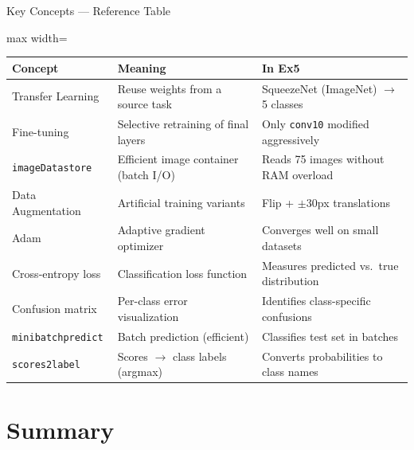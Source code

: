 \documentclass[aspectratio=169,xcolor=dvipsnames]{beamer}
\begin{document}
\begin{frame}{Key Concepts — Reference Table}
    \begin{adjustbox}{max width=\textwidth}
    \begin{tabular}{lll}
        \toprule
        \textbf{Concept} & \textbf{Meaning} & \textbf{In Ex5} \\
        \midrule
        Transfer Learning   & Reuse weights from a source task & SqueezeNet (ImageNet) $\to$ 5 classes \\
        Fine-tuning         & Selective retraining of final layers & Only \texttt{conv10} modified aggressively \\
        \texttt{imageDatastore} & Efficient image container (batch I/O) & Reads 75 images without RAM overload \\
        Data Augmentation   & Artificial training variants & Flip + $\pm30$px translations \\
        Adam                & Adaptive gradient optimizer & Converges well on small datasets \\
        Cross-entropy loss  & Classification loss function & Measures predicted vs.\ true distribution \\
        Confusion matrix    & Per-class error visualization & Identifies class-specific confusions \\
        \texttt{minibatchpredict} & Batch prediction (efficient) & Classifies test set in batches \\
        \texttt{scores2label}    & Scores $\to$ class labels (argmax) & Converts probabilities to class names \\
        \bottomrule
    \end{tabular}
    \end{adjustbox}
\end{frame}

\section{Summary}
\end{document}
